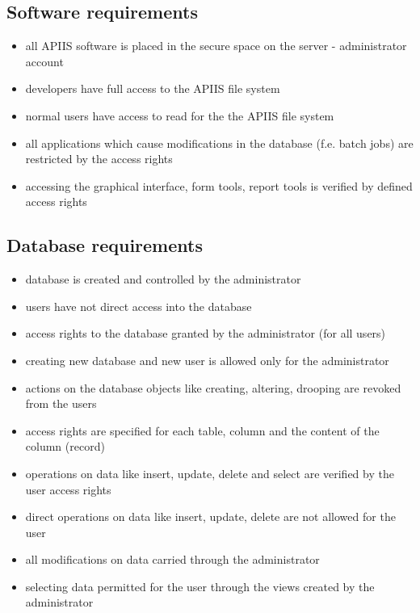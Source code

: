 \subsection{Software requirements\label{strequirements}}
\begin{itemize}
\item all APIIS software is placed in the secure space on the server - administrator account
\item developers have full access to the APIIS file system
\item normal users have access to read for the the APIIS file system 
\item all applications which cause modifications in the database (f.e. batch jobs) are restricted by the access rights
\item accessing the graphical interface, form tools, report tools is verified by defined access rights  

\end{itemize}
\subsection{Database requirements\label{dbtrequirements}}
\begin{itemize}
\item database is created and controlled by the administrator
\item users have not direct access into the database
\item access rights to the database granted by the administrator (for all users)
\item creating new database and new user is allowed only for the administrator
\item actions on the database objects like creating, altering, drooping are revoked from the users
\item access rights are specified for each table, column and the content of the column (record)  
\item operations on data like insert, update, delete and select are verified by the user access rights 
\item direct operations on data like insert, update, delete are not allowed for the user
\item all modifications on data carried through the administrator
\item selecting data permitted for the user through the views created by the administrator
\end{itemize}

